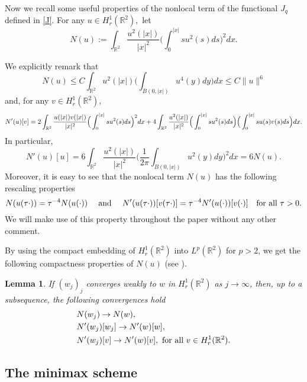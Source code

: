 \documentclass[11pt,leqno,twoside,reqno]{amsart}
\numberwithin{equation}{section}
\newtheorem{lemma}[theorem]{Lemma}
\begin{document}
Now we recall some useful properties of the nonlocal term of the functional $J_q$ defined in \eqref{J}.
For any $u\in {H^1_r({{\mathbb{R}^2}})},$ let
\begin{equation*}
N(u) := \int_{\mathbb R^2} \frac{u^2(|x|)}{|x|^2}\Big(\int_0^{|x|}su^2(s)ds\Big)^2 dx.
\end{equation*}

We explicitly remark that
\begin{equation*} 
	N(u)
	{\leqslant}
	C\int_{\mathbb R^2} u^2(|x|)\Big(\int_{B(0,|x|)}u^4(y)dy\Big) dx 
	{\leqslant} C \|u\|^6 
\end{equation*}
and, for any $v\in {H^1_r({{\mathbb{R}^2}})}$,
\[
N'(u)[v] 
=
2\int_{\mathbb{R}^2} \frac{u(|x|) v(|x|)}{|x|^{2}}\Big(\int_{0}^{|x|} su^{2}(s)ds\Big)^{2}dx
+4\int_{\mathbb{R}^2}\frac{u^{2}(|x|)}{|x|^{2}}\Big( \int_{0}^{|x|}su^{2}(s)ds\Big)\Big(\int_{0}^{|x|}su(s)v(s)ds\Big)dx. \\
\]
In particular,
\begin{equation}\label{+N'}
N'(u)[u] = 6\int_{\mathbb R^2} \frac{u^2(|x|)}{|x|^2}\Big(\frac{1}{2\pi}\int_{B(0,|x|)}u^2(y)dy\Big)^2 dx = 6N(u).
\end{equation}
Moreover, it is easy to see that the nonlocal term $N(u)$ has the following rescaling properties
$$ N(u(\tau \cdot))=\tau^{-4}N(u(\cdot))\quad \text{ and }\quad N'(u(\tau \cdot))[v(\tau \cdot)]=\tau^{-4}N'(u(\cdot))[v(\cdot)]\quad\hbox{for all } \tau>0.$$
We will make use of this property throughout the paper without any other comment.

By using the compact embedding of $H_r^1(\mathbb{R}^2)$ into $L^p(\mathbb{R}^2)$ for $p>2$, we get the following compactness properties of $N(u)$ 
(see \cite[Lemma 3.2]{BHS}).
\begin{lemma}\label{lem:compact}
	If $(w_{j})_j$ converges  weakly to $w$ in $H_r^{1}(\mathbb R^{2})$ as $j\rightarrow\infty$, then, up to a subsequence,
	the following convergences hold
	\begin{align*}
	& N(w_{j})\to N(w), \\
	& N'(w_{j})[w_{j}]\to N'(w)[w],\\
	& N'(w_{j})[v] \to N'(w)[v], \hbox{ for all } v\in H_r^{1}(\mathbb R^{2}).
	\end{align*}
\end{lemma}

\subsection{The minimax scheme}
\end{document}
